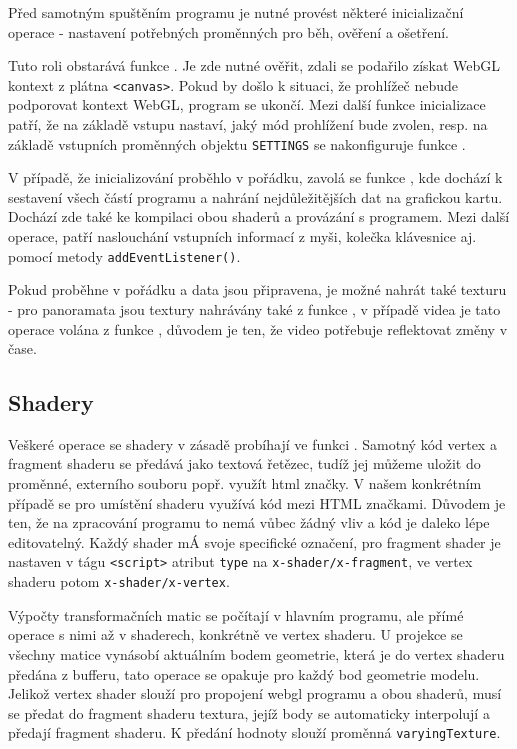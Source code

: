 Před samotným spuštěním programu je nutné provést některé inicializační operace - nastavení potřebných proměnných pro běh, ověření a ošetření. 

Tuto roli obstarává funkce \texttt{\initProgram}. Je zde nutné ověřit, zdali se podařilo získat WebGL kontext z plátna \texttt{<canvas>}. Pokud by došlo k situaci, že prohlížeč nebude podporovat kontext WebGL, program se ukončí. Mezi další funkce inicializace patří, že na základě vstupu nastaví, jaký mód prohlížení bude zvolen, resp. na základě vstupních proměnných objektu \texttt{SETTINGS}  se nakonfiguruje funkce \texttt{\createSphereGeometry}. 

V případě, že inicializování proběhlo v pořádku, zavolá se funkce \texttt{\setupProgram}, kde dochází k sestavení všech částí programu a nahrání nejdůležitějších dat na grafickou kartu. Dochází zde také ke kompilaci obou shaderů a provázání s programem. Mezi další operace, patří naslouchání vstupních informací z myši, kolečka klávesnice aj.  pomocí metody \texttt{addEventListener()}.

Pokud  \texttt{\setupProgram} proběhne v pořádku a  data jsou připravena, je možné nahrát také texturu - pro panoramata jsou textury nahrávány také z funkce \texttt{\setupProgram}, v případě videa je tato operace  volána z funkce \texttt{\render}, důvodem je ten, že video potřebuje reflektovat změny v čase.



\subsection{Shadery}
Veškeré operace se shadery v zásadě probíhají ve funkci \texttt{\setupProgram}. Samotný kód vertex a fragment shaderu se předává jako textová řetězec, tudíž jej můžeme uložit do proměnné, externího souboru popř. využít html značky. V našem konkrétním případě  se pro umístění shaderu využívá kód mezi HTML značkami. Důvodem je ten, že na zpracování programu to nemá vůbec žádný vliv  a  kód je daleko lépe editovatelný. Každý shader mÁ svoje specifické označení, pro fragment shader je nastaven v tágu \texttt{<script>} atribut \texttt{type} na \texttt{x-shader/x-fragment}, ve vertex shaderu potom \texttt{x-shader/x-vertex}.

Výpočty transformačních matic se počítají v hlavním programu, ale přímé operace s nimi až v shaderech, konkrétně ve vertex shaderu. U projekce se všechny matice  vynásobí aktuálním bodem geometrie, která je do vertex shaderu předána z bufferu, tato operace se opakuje pro každý bod geometrie modelu. Jelikož vertex shader slouží pro propojení webgl programu  a obou shaderů, musí se předat do fragment shaderu textura, jejíž body se automaticky interpolují a předají fragment shaderu. K předání hodnoty slouží proměnná \texttt{varyingTexture}.

